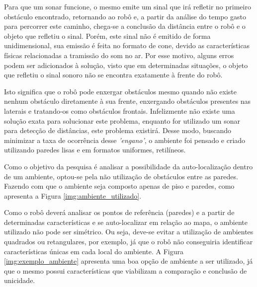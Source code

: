 	Para que um sonar funcione, o mesmo emite um sinal que irá refletir no primeiro obstáculo encontrado, retornando ao robô e, a partir da análise do tempo gasto para percorrer este caminho, chega-se a conclusão da distância entre o robô e o objeto que refletiu o sinal. Porém, este sinal não é emitido de forma unidimensional, sua emissão é feita no formato de cone, devido as características físicas relacionadas a tramissão do som no ar. Por esse motivo, alguns erros podem ser adicionados à solução, visto que em determinadas situações, o objeto que refletiu o sinal sonoro não se encontra exatamente à frente do robô.

	Isto significa que o robô pode enxergar obstáculos mesmo quando não existe nenhum obstáculo diretamente à sua frente, enxergando obstáculos presentes nas laterais e tratando-os como obstáculos frontais. Infelizmente não existe uma solução exata para solucionar este problema, enquanto for utilizado um sonar para detecção de distâncias, este problema existirá.
	Desse modo, buscando minimizar a taxa de ocorrência desse \textit{'engano'}, o ambiente foi pensado e criado utilizando paredes lisas e em formatos uniformes, retilíneos.

	Como o objetivo da pesquisa é analisar a possibilidade da auto-localização dentro de um ambiente, optou-se pela não utilização de obstáculos entre as paredes. Fazendo com que o ambiente seja composto apenas de piso e paredes, como apresenta a Figura \ref{img:ambiente_utilizado}.

	Como o robô deverá analisar os pontos de referência (paredes) e a partir de determinadas características e se auto-localizar em relação ao mapa, o ambiente utilizado não pode ser simétrico. Ou seja, deve-se evitar a utilização de ambientes quadrados ou retangulares, por exemplo, já que o robô não conseguiria identificar características únicas em cada local do ambiente.
	A Figura \ref{img:exemplo_ambiente} apresenta uma boa opção de ambiente a ser utilizado, já que o mesmo possui características que viabilizam a comparação e conclusão de unicidade.

